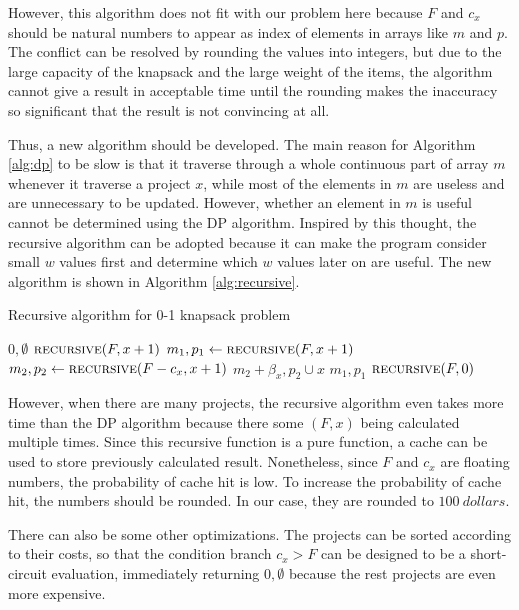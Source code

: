 \documentclass{article}
\begin{document}
However, this algorithm does not fit with our problem here
because $F$ and $c_x$ should be natural numbers to appear as index of elements in arrays like $m$ and $p$.
The conflict can be resolved by rounding the values into integers,
but due to the large capacity of the knapsack and the large weight of the items,
the algorithm cannot give a result in acceptable time until the rounding makes the inaccuracy so significant that the result is not convincing at all.

Thus, a new algorithm should be developed.
The main reason for Algorithm \ref{alg:dp} to be slow is that it traverse through a whole continuous part of array $m$ whenever it traverse a project $x$,
while most of the elements in $m$ are useless and are unnecessary to be updated.
However, whether an element in $m$ is useful cannot be determined using the DP algorithm.
Inspired by this thought, the recursive algorithm can be adopted because it can make the program consider small $w$ values first and determine which $w$ values later on are useful.
The new algorithm is shown in Algorithm \ref{alg:recursive}.

\begin{algorithm}[h!]
\caption{Recursive algorithm for 0-1 knapsack problem}
\label{alg:recursive}
\begin{algorithmic}
	\State\Return$0,\emptyset$
	\State\Return$\Call{recursive}{F,x+1}$
\Else
	\State$m_1,p_1\leftarrow\Call{recursive}{F,x+1}$
	\State$m_2,p_2\leftarrow\Call{recursive}{F-c_x,x+1}$
		\State\Return$m_2+\beta_x,p_2\cup x$
	\Else
		\State\Return$m_1,p_1$
	\EndIf
\EndIf
\EndFunction
{}
\State\Return$\Call{recursive}{F,0}$
\EndFunction
\end{algorithmic}
\end{algorithm}

However, when there are many projects, the recursive algorithm even takes more time than the DP algorithm
because there some $\left(F,x\right)$ being calculated multiple times.
Since this recursive function is a pure function, a cache can be used to store previously calculated result.
Nonetheless, since $F$ and $c_x$ are floating numbers, the probability of cache hit is low.
To increase the probability of cache hit, the numbers should be rounded.
In our case, they are rounded to $\SI{100}{dollars}$.

There can also be some other optimizations.
The projects can be sorted according to their costs, so that the condition branch $c_x>F$ can be designed to be a short-circuit evaluation,
immediately returning $0,\emptyset$ because the rest projects are even more expensive.
\end{document}
